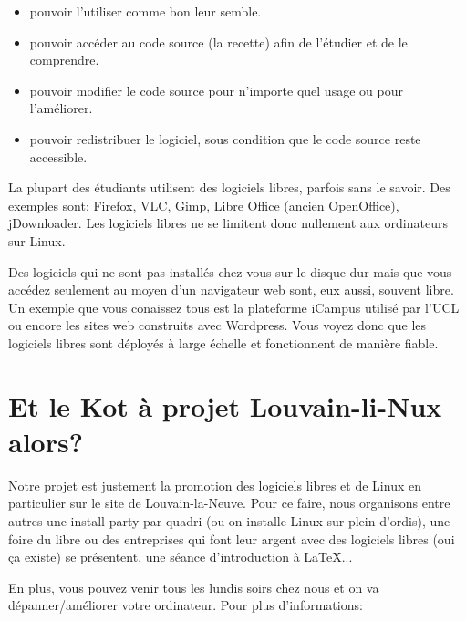 \documentclass[11pt]{../fiche}
\begin{document}
\begin{itemize}
\item pouvoir l’utiliser comme bon leur semble.
\item pouvoir accéder au code source (la recette) afin de l’étudier et de le comprendre.
\item pouvoir modifier le code source pour n’importe quel usage ou pour l’améliorer.
\item pouvoir redistribuer le logiciel, sous condition que le code source reste accessible.
\end{itemize}

La plupart des étudiants utilisent des logiciels libres, parfois sans le savoir.
Des exemples sont: Firefox, VLC, Gimp, Libre Office (ancien OpenOffice), jDownloader.
Les logiciels libres ne se limitent donc nullement aux ordinateurs sur Linux.

Des logiciels qui ne sont pas installés chez vous sur le disque dur mais
que vous accédez seulement au moyen d'un navigateur web sont, eux aussi, souvent libre.
Un exemple que vous conaissez tous est la plateforme iCampus utilisé par l'UCL
ou encore les sites web construits avec Wordpress. Vous voyez donc que les logiciels
libres sont déployés à large échelle et fonctionnent de manière fiable.

\section*{Et le Kot à projet Louvain-li-Nux alors?}
Notre projet est justement la promotion des logiciels libres et de Linux en particulier sur le site de Louvain-la-Neuve.
Pour ce faire, nous organisons entre autres une install party par quadri (ou on installe Linux sur plein d'ordis),
une foire du libre ou des entreprises qui font leur argent avec des logiciels libres (oui ça existe) se présentent,
une séance d'introduction à \LaTeX{}...

En plus, vous pouvez venir tous les lundis soirs chez nous et on va dépanner/améliorer votre ordinateur.
Pour plus d'informations:
\end{document}
